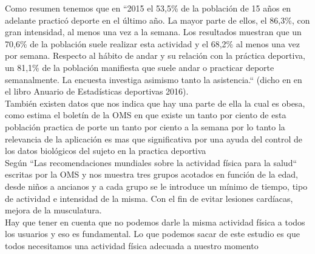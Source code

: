 \documentclass[a4paper, 11pt]{article}
\begin{document}
      Como resumen tenemos que en ``2015 el 53,5\% de la población de 15 años en
      adelante practicó deporte en el último año. La mayor parte de ellos, el
      86,3\%, con gran intensidad, al menos una vez a la semana. Los resultados
      muestran que un 70,6\% de la población suele realizar esta actividad y el
      68,2\% al menos una vez por semana. Respecto al hábito de andar y su
      relación con la práctica deportiva, un 81,1\% de la población manifiesta
      que suele andar o practicar deporte semanalmente. La encuesta investiga
      asimismo tanto la asistencia.`` (dicho en en el libro Anuario de
      Estadísticas deportivas 2016).\\

      También existen datos que nos indica que hay una parte de ella la cual
      es obesa, como estima el boletín de la OMS en que existe un tanto
      por ciento de esta población practica de porte un tanto por ciento a la
      semana por lo tanto la relevancia de la aplicación es mas que
      significativa por una ayuda del control de los datos biológicos del sujeto
      en la practica deportiva\\

      Según ``Las recomendaciones mundiales sobre la actividad física para la
      salud`` escritas por la OMS y nos muestra tres grupos acotados en función
      de la edad, desde niños a ancianos y a cada grupo se le introduce un
      mínimo de tiempo, tipo de actividad e intensidad de la misma. Con el fin
      de evitar lesiones cardíacas, mejora de la musculatura.\\

      Hay que tener en cuenta que no podemos darle la misma actividad física a
      todos los usuarios y eso es fundamental. Lo que podemos sacar de este
      estudio es que todos necesitamos una actividad física adecuada a nuestro
      momento\\
\end{document}
